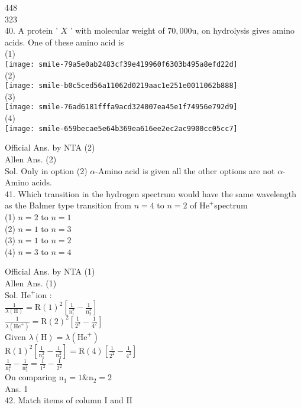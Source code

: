 \documentclass[10pt]{article}
\begin{document}
448\\
323\\
40. A protein ' \(X\) ' with molecular weight of \(70,000 \mathrm{u}\), on hydrolysis gives amino acids. One of these amino acid is\\
(1)\\
\texttt{[image: smile-79a5e0ab2483cf39e419960f6303b495a8efd22d]}\\
(2)\\
\texttt{[image: smile-b0c5ced56a11062d0219aac1e251e0011062b888]}\\
(3)\\
\texttt{[image: smile-76ad6181fffa9acd324007ea45e1f74956e792d9]}\\
(4)\\
\texttt{[image: smile-659becae5e64b369ea616ee2ec2ac9900cc05cc7]}

Official Ans. by NTA (2)\\
Allen Ans. (2)\\
Sol. Only in option (2) \(\alpha\)-Amino acid is given all the other options are not \(\alpha\)-Amino acids.\\
41. Which transition in the hydrogen spectrum would have the same wavelength as the Balmer type transition from \(n=4\) to \(n=2\) of \(\mathrm{He}^{+}\)spectrum\\
(1) \(n=2\) to \(n=1\)\\
(2) \(n=1\) to \(n=3\)\\
(3) \(n=1\) to \(n=2\)\\
(4) \(n=3\) to \(n=4\)

Official Ans. by NTA (1)\\
Allen Ans. (1)\\
Sol. \(\mathrm{He}^{+}\)ion :\\
\(\frac{1}{\lambda(\mathrm{H})}=\mathrm{R}(1)^{2}\left[\frac{1}{\mathrm{n}_{1}^{2}}-\frac{1}{\mathrm{n}_{2}^{2}}\right]\)\\
\(\frac{1}{\lambda\left(\mathrm{He}^{+}\right)}=\mathrm{R}(2)^{2}\left[\frac{1}{2^{2}}-\frac{1}{4^{2}}\right]\)\\
Given \(\lambda(\mathrm{H})=\lambda\left(\mathrm{He}^{+}\right)\)\\
\(\mathrm{R}(1)^{2}\left[\frac{1}{\mathrm{n}_{1}^{2}}-\frac{1}{\mathrm{n}_{2}^{2}}\right]=\mathrm{R}(4)\left[\frac{1}{2^{2}}-\frac{1}{4^{2}}\right]\)\\
\(\frac{1}{\mathrm{n}_{1}^{2}}-\frac{1}{\mathrm{n}_{2}^{2}}=\frac{1}{1^{2}}-\frac{1}{2^{2}}\)\\
On comparing \(\mathrm{n}_{1}=1 \& \mathrm{n}_{2}=2\)\\
Ans. 1\\
42. Match items of column I and II
\end{document}
